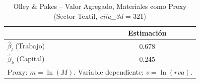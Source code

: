 \begin{table}[H]
\centering
\caption{Olley \& Pakes -- Valor Agregado, Materiales como Proxy (Sector Textil, \textit{ciiu\_3d} = 321)}
\begin{tabular}{lc}
\toprule
 & Estimación \\
\midrule
$\hat{\beta}_l$ (Trabajo) & 0.678 \\
$\hat{\beta}_k$ (Capital) & 0.245 \\
\bottomrule
\multicolumn{2}{l}{\small Proxy: $m = \ln(M)$. Variable dependiente: $v = \ln(\mathit{rva})$.}
\end{tabular}
\end{table}
